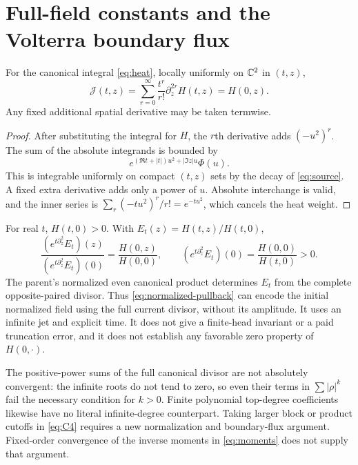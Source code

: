\section{Full-field constants and the Volterra boundary flux}
\label{sec:fullfield}

\begin{proposition}
\label{prop:pullback}
For the canonical integral \eqref{eq:heat}, locally uniformly on
$\mathbb C^2$ in $(t,z)$,
\begin{equation}
 \mathcal J(t,z)=\sum_{r=0}^\infty\frac{t^r}{r!}
                       \partial_z^{2r}H(t,z)=H(0,z).
 \label{eq:pullback}
\end{equation}
Any fixed additional spatial derivative may be taken termwise.
\end{proposition}
\begin{proof}
After substituting the integral for $H$, the $r$th derivative adds
$(-u^2)^r$. The sum of the absolute integrands is bounded by
\[
 e^{(\Re t+|t|)u^2+|\Im z|u}\Phi(u).
\]
This is integrable uniformly on compact $(t,z)$ sets by the decay
of \eqref{eq:source}. A fixed extra derivative adds only a power
of $u$. Absolute interchange is valid, and the inner series is
$\sum_r(-tu^2)^r/r!=e^{-tu^2}$, which cancels the heat weight.
\end{proof}

For real $t$, $H(t,0)>0$. With $E_t(z)=H(t,z)/H(t,0)$,
\begin{equation}
 \frac{(e^{t\partial_z^2}E_t)(z)}{(e^{t\partial_z^2}E_t)(0)}
       =\frac{H(0,z)}{H(0,0)},\qquad
 (e^{t\partial_z^2}E_t)(0)=\frac{H(0,0)}{H(t,0)}>0.
 \label{eq:normalized-pullback}
\end{equation}
The parent's normalized even canonical product determines $E_t$
from the complete opposite-paired divisor. Thus
\eqref{eq:normalized-pullback} can encode the initial normalized
field using the full current divisor, without its amplitude.
It uses an infinite jet and explicit time. It does not give a
finite-head invariant or a paid truncation error, and it does not
establish any favorable zero property of $H(0,\cdot)$.

The positive-power sums of the full canonical divisor are not
absolutely convergent: the infinite roots do not tend to zero, so
even their terms in $\sum|\rho|^k$ fail the necessary condition
for $k>0$. Finite polynomial top-degree coefficients likewise have
no literal infinite-degree counterpart. Taking larger block or
product cutoffs in \eqref{eq:C4} requires a new normalization and
boundary-flux argument. Fixed-order convergence of the inverse
moments in \eqref{eq:moments} does not supply that argument.

